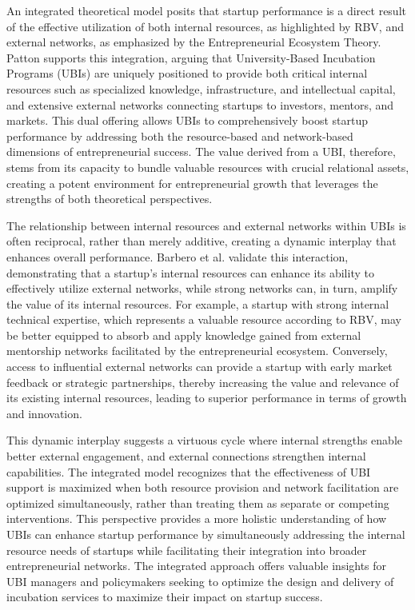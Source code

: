 \documentclass[../Main.tex]{subfiles}
\begin{document}
An integrated theoretical model posits that startup performance is a direct result of the effective utilization of both internal resources, as highlighted by RBV, and external networks, as emphasized by the Entrepreneurial Ecosystem Theory. Patton \cite{patton2014realising} supports this integration, arguing that University-Based Incubation Programs (UBIs) are uniquely positioned to provide both critical internal resources such as specialized knowledge, infrastructure, and intellectual capital, and extensive external networks connecting startups to investors, mentors, and markets. This dual offering allows UBIs to comprehensively boost startup performance by addressing both the resource-based and network-based dimensions of entrepreneurial success. The value derived from a UBI, therefore, stems from its capacity to bundle valuable resources with crucial relational assets, creating a potent environment for entrepreneurial growth that leverages the strengths of both theoretical perspectives.

The relationship between internal resources and external networks within UBIs is often reciprocal, rather than merely additive, creating a dynamic interplay that enhances overall performance. Barbero et al. \cite{barbero2012revisiting} validate this interaction, demonstrating that a startup's internal resources can enhance its ability to effectively utilize external networks, while strong networks can, in turn, amplify the value of its internal resources. For example, a startup with strong internal technical expertise, which represents a valuable resource according to RBV, may be better equipped to absorb and apply knowledge gained from external mentorship networks facilitated by the entrepreneurial ecosystem. Conversely, access to influential external networks can provide a startup with early market feedback or strategic partnerships, thereby increasing the value and relevance of its existing internal resources, leading to superior performance in terms of growth and innovation.

This dynamic interplay suggests a virtuous cycle where internal strengths enable better external engagement, and external connections strengthen internal capabilities. The integrated model recognizes that the effectiveness of UBI support is maximized when both resource provision and network facilitation are optimized simultaneously, rather than treating them as separate or competing interventions. This perspective provides a more holistic understanding of how UBIs can enhance startup performance by simultaneously addressing the internal resource needs of startups while facilitating their integration into broader entrepreneurial networks. The integrated approach offers valuable insights for UBI managers and policymakers seeking to optimize the design and delivery of incubation services to maximize their impact on startup success.
\end{document}
